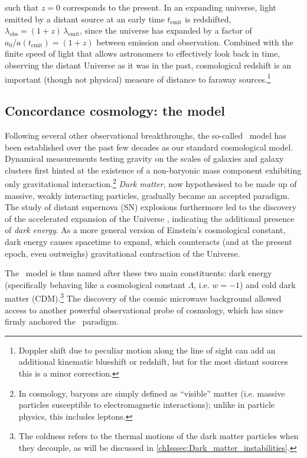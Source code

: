 \noindent such that $z = 0$ corresponds to the present. In an expanding universe, light emitted by a distant source at an early time $t_\text{emit}$ is redshifted, $\lambda_\text{obs} = (1 + z) \, \lambda_\text{emit}$, since the universe has expanded by a factor of $a_0 / a(t_\text{emit}) = (1 + z)$ between emission and observation. Combined with the finite speed of light that allows astronomers to effectively look back in time, observing the distant Universe as it was in the past, cosmological redshift is an important (though not physical) measure of distance to faraway sources.\footnote{Doppler shift due to peculiar motion along the line of sight can add an additional kinematic blueshift or redshift, but for the most distant sources this is a minor correction.}

\subsection{Concordance cosmology: the \texorpdfstring{\LCDM}{ΛCDM} model}
\label{chIssec:LCDM_model}

Following several other observational breakthroughs, the so-called \LCDM\ model has been established over the past few decades as our standard cosmological model. Dynamical measurements testing gravity on the scales of galaxies and galaxy clusters \citep{1933AcHPh...6..110Z, 1973A&A....26..483R, 1974Natur.250..309E, 1974ApJ...193L...1O, 1978ApJ...225L.107R, 1980ApJ...238..471R} first hinted at the existence of a non-baryonic mass component exhibiting only gravitational interaction.\footnote{In cosmology, baryons are simply defined as ``visible'' matter (i.e. massive particles susceptible to electromagnetic interactions); unlike in particle physics, this includes leptons.} \textit{Dark matter}, now hypothesised to be made up of massive, weakly interacting particles, gradually became an accepted paradigm. The study of distant supernova (SN) explosions furthermore led to the discovery of the accelerated expansion of the Universe \citep{1998AJ....116.1009R, 1998ApJ...507...46S, 1999ApJ...517..565P}, indicating the additional presence of \textit{dark energy}. As a more general version of Einstein's cosmological constant, dark energy causes spacetime to expand, which counteracts (and at the present epoch, even outweighs) gravitational contraction of the Universe.

The \LCDM\ model is thus named after these two main constituents: dark energy (specifically behaving like a cosmological constant $\Lambda$, i.e. $w = -1$) and cold dark matter (CDM).\footnote{The coldness refers to the thermal motions of the dark matter particles when they decouple, as will be discussed in \cref{chIsssec:Dark_matter_instabilities}.} The discovery of the cosmic microwave background \citep[CMB;][]{1965ApJ...142..419P, 1965ApJ...142..414D} allowed access to another powerful observational probe of cosmology, which has since firmly anchored the \LCDM\ paradigm.

